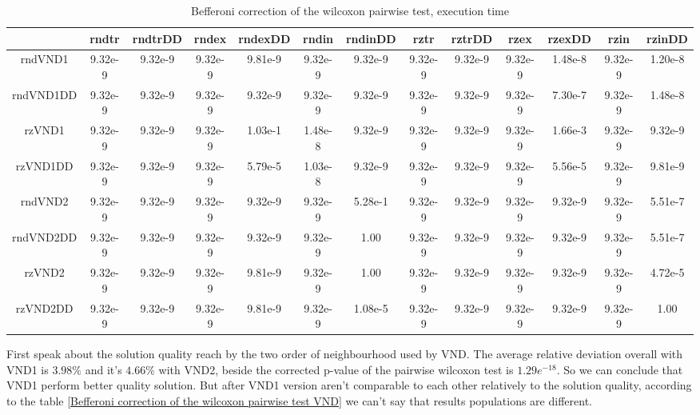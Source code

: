 \documentclass[12pt,a4paper]{article}
\begin{document}
\begin{table}[!h]
\leftskip -2.75cm
{
\footnotesize
\begin{tabular}{|*{13}{c|}}
  \hline
	~ & rndtr & rndtrDD & rndex & rndexDD & rndin & rndinDD & rztr & rztrDD & rzex & rzexDD & rzin & rzinDD \\
  \hline
	rndVND1 & 9.32e-9 & 9.32e-9 & 9.32e-9 & 9.81e-9 & 9.32e-9 & 9.32e-9 & 9.32e-9 & 9.32e-9 & 9.32e-9 & 1.48e-8 & 9.32e-9 & 1.20e-8 \\
	rndVND1DD & 9.32e-9 & 9.32e-9 & 9.32e-9 & 9.32e-9 & 9.32e-9 & 9.32e-9 & 9.32e-9 & 9.32e-9 & 9.32e-9 & 7.30e-7 & 9.32e-9 & 1.48e-8 \\
	rzVND1 & 9.32e-9 & 9.32e-9 & 9.32e-9 & 1.03e-1 & 1.48e-8 & 9.32e-9 & 9.32e-9 & 9.32e-9 & 9.32e-9 & 1.66e-3 & 9.32e-9 & 9.32e-9 \\
	rzVND1DD & 9.32e-9 & 9.32e-9 & 9.32e-9 & 5.79e-5 & 1.03e-8 & 9.32e-9 & 9.32e-9 & 9.32e-9 & 9.32e-9 & 5.56e-5 & 9.32e-9 & 9.81e-9 \\
	rndVND2 & 9.32e-9 & 9.32e-9 & 9.32e-9 & 9.32e-9 & 9.32e-9 & 5.28e-1 & 9.32e-9 & 9.32e-9 & 9.32e-9 & 9.32e-9 & 9.32e-9 & 5.51e-7 \\
	rndVND2DD & 9.32e-9 & 9.32e-9 & 9.32e-9 & 9.32e-9 & 9.32e-9 & 1.00 & 9.32e-9 & 9.32e-9 & 9.32e-9 & 9.32e-9 & 9.32e-9 & 5.51e-7 \\
	rzVND2 & 9.32e-9 & 9.32e-9 & 9.32e-9 & 9.81e-9 & 9.32e-9 & 1.00 & 9.32e-9 & 9.32e-9 & 9.32e-9 & 9.32e-9 & 9.32e-9 & 4.72e-5 \\
	rzVND2DD & 9.32e-9 & 9.32e-9 & 9.32e-9 & 9.81e-9 & 9.32e-9 & 1.08e-5 & 9.32e-9 & 9.32e-9 & 9.32e-9 & 9.32e-9 & 9.32e-9 & 1.00 \\
  \hline
\end{tabular}
\normalsize
}
\caption{Befferoni correction of the wilcoxon pairwise test, execution time}
\label{Befferoni correction of the wilcoxon pairwise test VND-single neighbourhood time}
\end{table} 
 
 
First speak about the solution quality reach by the two order of neighbourhood used by VND. The average relative deviation overall with VND1 is $3.98 \%$ and it's $4.66 \%$ with VND2, beside the corrected p-value of the pairwise wilcoxon test is $1.29e^{-18}$. So we can conclude that VND1 perform better quality solution. But after VND1 version aren't comparable to each other relatively to the solution quality, according to the table \ref{Befferoni correction of the wilcoxon pairwise test VND} we can't say that results populations are different.
\end{document}
